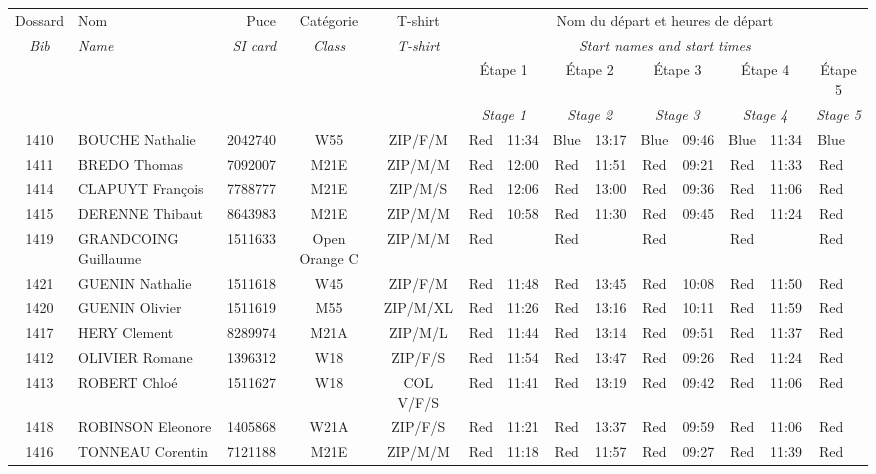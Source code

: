 \documentclass{report}
\begin{document}
  \begin{longtable}{|c|l|r|c|c|*{5}{cc|}}
    Dossard & Nom  & Puce    & Catégorie & T-shirt & \multicolumn{10}{c|}{Nom du départ et heures de départ} \\
    \itshape Bib     & \itshape Name & \itshape SI card & \itshape Class  & \itshape  T-shirt  & \multicolumn{10}{c|}{\itshape Start names and start times} \\
    \hline
    & & & & & \multicolumn{2}{c|}{Étape 1} & \multicolumn{2}{c|}{Étape 2} & \multicolumn{2}{c|}{Étape 3} & \multicolumn{2}{c|}{Étape 4} & \multicolumn{2}{c|}{Étape 5} \\
    & & & & & \multicolumn{2}{c|}{\itshape Stage 1} & \multicolumn{2}{c|}{\itshape Stage 2} & \multicolumn{2}{c|}{\itshape Stage 3} & \multicolumn{2}{c|}{\itshape Stage 4} & \multicolumn{2}{c|}{\itshape Stage 5} \\
    \hline
    1410 & BOUCHE Nathalie & 2042740 & W55 & ZIP/F/M & Red & 11:34 & Blue & 13:17 & Blue & 09:46 & Blue & 11:34 & Blue &  \\
    1411 & BREDO Thomas & 7092007 & M21E & ZIP/M/M & Red & 12:00 & Red & 11:51 & Red & 09:21 & Red & 11:33 & Red &  \\
    1414 & CLAPUYT François & 7788777 & M21E & ZIP/M/S & Red & 12:06 & Red & 13:00 & Red & 09:36 & Red & 11:06 & Red &  \\
    1415 & DERENNE Thibaut & 8643983 & M21E & ZIP/M/M & Red & 10:58 & Red & 11:30 & Red & 09:45 & Red & 11:24 & Red &  \\
    1419 & GRANDCOING Guillaume & 1511633 & Open Orange C & ZIP/M/M & Red &   & Red &   & Red &   & Red &   & Red &  \\
    1421 & GUENIN Nathalie & 1511618 & W45 & ZIP/F/M & Red & 11:48 & Red & 13:45 & Red & 10:08 & Red & 11:50 & Red &  \\
    1420 & GUENIN Olivier & 1511619 & M55 & ZIP/M/XL & Red & 11:26 & Red & 13:16 & Red & 10:11 & Red & 11:59 & Red &  \\
    1417 & HERY Clement & 8289974 & M21A & ZIP/M/L & Red & 11:44 & Red & 13:14 & Red & 09:51 & Red & 11:37 & Red &  \\
    1412 & OLIVIER Romane & 1396312 & W18 & ZIP/F/S & Red & 11:54 & Red & 13:47 & Red & 09:26 & Red & 11:24 & Red &  \\
    1413 & ROBERT Chloé & 1511627 & W18 & COL V/F/S & Red & 11:41 & Red & 13:19 & Red & 09:42 & Red & 11:06 & Red &  \\
    1418 & ROBINSON Eleonore & 1405868 & W21A & ZIP/F/S & Red & 11:21 & Red & 13:37 & Red & 09:59 & Red & 11:06 & Red &  \\
    1416 & TONNEAU Corentin & 7121188 & M21E & ZIP/M/M & Red & 11:18 & Red & 11:57 & Red & 09:27 & Red & 11:39 & Red &  \\
  \end{longtable}
\end{document}
